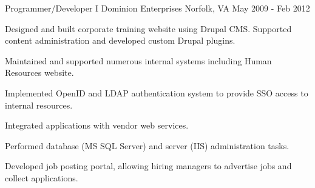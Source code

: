 \begin{cventries}
  \cventry
    {Programmer/Developer I} %
    {Dominion Enterprises} %
    {Norfolk, VA} %
    {May 2009 - Feb 2012} %
    {
      \begin{cvitems} %
        \item {Designed and built corporate training website using Drupal CMS. Supported content
        administration and developed custom Drupal plugins.}
        \item {Maintained and supported numerous internal systems including Human Resources
        website.}
        \item {Implemented OpenID and LDAP authentication system to provide SSO access to internal
        resources.}
        \item {Integrated applications with vendor web services.}
        \item {Performed database (MS SQL Server) and server (IIS) administration tasks.}
        \item {Developed job posting portal, allowing hiring managers to advertise jobs and collect
        applications.}
      \end{cvitems}
    }

\end{cventries}
